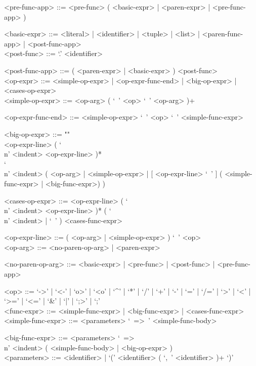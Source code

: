 \documentclass{article}
\begin{document}
\begin{grammar}
<pre-func-app> ::= <pre-func> ( <basic-expr> | <paren-expr> | <pre-func-app> )

<basic-expr> ::=
<literal> | <identifier> | <tuple> | <list> | <paren-func-app> | <post-func-app> \\

<post-func> ::= `.' <identifier>

<post-func-app> ::= ( <paren-expr> | <basic-expr> ) <post-func> \\

<op-expr> ::=
<simple-op-expr> | <op-expr-func-end> | <big-op-expr> | <cases-op-expr>
\\

<simple-op-expr> ::=  <op-arg> ( `\ ' <op>  `\ ' <op-arg> )+

<op-expr-func-end> ::= <simple-op-expr> `\ '  <op> `\ ' <simple-func-expr>

<big-op-expr> ::= ""\\
<op-expr-line> ( `\\n' <indent> <op-expr-line> )* \\
`\\n' <indent>
( <op-arg> | <simple-op-expr> |
  [ <op-expr-line> `\ ' ] ( <simple-func-expr> | <big-func-expr>)
)

<cases-op-expr> ::=
<op-expr-line> ( `\\n' <indent> <op-expr-line> )*
( `\\n' <indent> | `\ ' ) <cases-func-expr> 

<op-expr-line> ::= ( <op-arg> | <simple-op-expr> ) `\ ' <op> 
\\

<op-arg> ::= <no-paren-op-arg> | <paren-expr>

<no-paren-op-arg> ::= <basic-expr> | <pre-func> | <post-func> | <pre-func-app>

<op> ::= 
`->' | `<-' | `o>' | `<o' | `^' | `*' | `/' | `+' | `-' |
`=' | `/=' | `>' | `<' | `>=' | `<=' | `\&' | `|' | `;>' | `;'\\

<func-expr> ::= <simple-func-expr> | <big-func-expr> | <cases-func-expr> \\

<simple-func-expr> ::= <parameters> `\ =>\ ' <simple-func-body>

<big-func-expr> ::=
<parameters> `\ =>\\n' <indent> ( <simple-func-body> | <big-op-expr> )
\\

<parameters> ::= <identifier> | `(' <identifier> ( `,\ ' <identifier> )+ `)'


\end{grammar}
\end{document}

